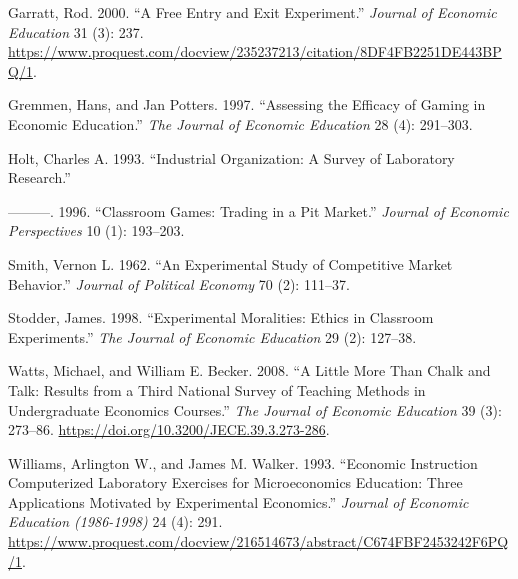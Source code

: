 \documentclass[
]{article}
\newlength{\cslhangindent}
\newlength{\cslentryspacingunit} %
\newenvironment{CSLReferences}[2] %
 {%
  \setlength{\parindent}{0pt}
  \ifodd #1
  \let\oldpar\par
  \def\par{\hangindent=\cslhangindent\oldpar}
  \fi
  \setlength{\parskip}{#2\cslentryspacingunit}
 }%
 {}
\begin{document}
\begin{CSLReferences}{1}{0}
\leavevmode{}%
Garratt, Rod. 2000. {``A Free Entry and Exit Experiment.''}
\emph{Journal of Economic Education} 31 (3): 237.
\url{https://www.proquest.com/docview/235237213/citation/8DF4FB2251DE443BPQ/1}.

\leavevmode{}%
Gremmen, Hans, and Jan Potters. 1997. {``Assessing the Efficacy of
Gaming in Economic Education.''} \emph{The Journal of Economic
Education} 28 (4): 291--303.

\leavevmode{}%
Holt, Charles A. 1993. {``Industrial {Organization}: {A} {Survey} of
{Laboratory} {Research}.''}

\leavevmode{}%
---------. 1996. {``Classroom Games: {Trading} in a Pit Market.''}
\emph{Journal of Economic Perspectives} 10 (1): 193--203.

\leavevmode{}%
Smith, Vernon L. 1962. {``An Experimental Study of Competitive Market
Behavior.''} \emph{Journal of Political Economy} 70 (2): 111--37.

\leavevmode{}%
Stodder, James. 1998. {``Experimental Moralities: {Ethics} in Classroom
Experiments.''} \emph{The Journal of Economic Education} 29 (2):
127--38.

\leavevmode{}%
Watts, Michael, and William E. Becker. 2008. {``A {Little} {More} Than
{Chalk} and {Talk}: {Results} from a {Third} {National} {Survey} of
{Teaching} {Methods} in {Undergraduate} {Economics} {Courses}.''}
\emph{The Journal of Economic Education} 39 (3): 273--86.
\url{https://doi.org/10.3200/JECE.39.3.273-286}.

\leavevmode{}%
Williams, Arlington W., and James M. Walker. 1993. {``Economic
{Instruction} {Computerized} {Laboratory} {Exercises} for
{Microeconomics} {Education}: {Three} {Applications} {Motivated} by
{Experimental} {Economics}.''} \emph{Journal of Economic Education
(1986-1998)} 24 (4): 291.
\url{https://www.proquest.com/docview/216514673/abstract/C674FBF2453242F6PQ/1}.

\end{CSLReferences}
\end{document}

